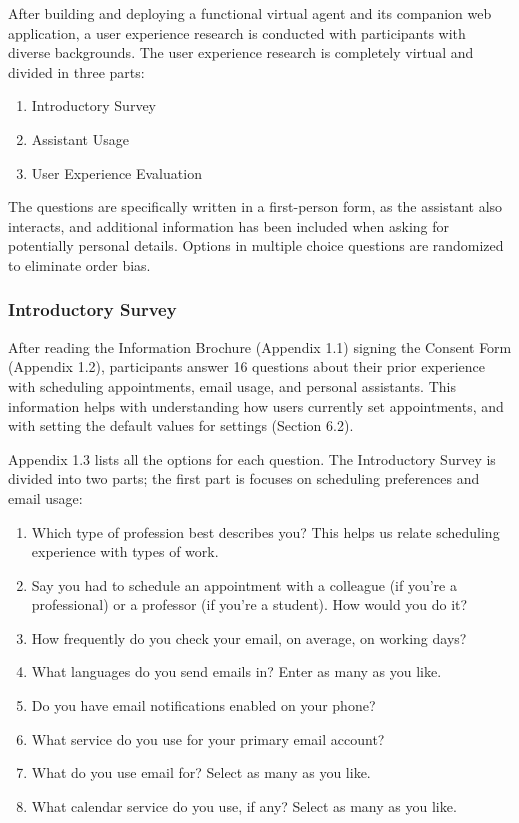 \documentclass{article}
\begin{document}
After building and deploying a functional virtual agent and its companion web application, a user experience research is conducted with participants with diverse backgrounds. The user experience research is completely virtual and divided in three parts:

\begin{enumerate}
	\item Introductory Survey
	\item Assistant Usage
	\item User Experience Evaluation
\end{enumerate}

The questions are specifically written in a first-person form, as the assistant also interacts, and additional information has been included when asking for potentially personal details. Options in multiple choice questions are randomized to eliminate order bias.

\subsubsection{Introductory Survey}

After reading the Information Brochure (Appendix 1.1) signing the Consent Form (Appendix 1.2), participants answer 16 questions about their prior experience with scheduling appointments, email usage, and personal assistants. This information helps with understanding how users currently set appointments, and with setting the default values for settings (Section 6.2).

Appendix 1.3 lists all the options for each question. The Introductory Survey is divided into two parts; the first part is focuses on scheduling preferences and email usage:

\begin{enumerate}
	\item Which type of profession best describes you? This helps us relate scheduling experience with types of work.
	\item Say you had to schedule an appointment with a colleague (if you're a professional) or a professor (if you're a student). How would you do it?
	\item How frequently do you check your email, on average, on working days?
	\item What languages do you send emails in? Enter as many as you like.
	\item Do you have email notifications enabled on your phone?
	\item What service do you use for your primary email account?
	\item What do you use email for? Select as many as you like.
	\item What calendar service do you use, if any? Select as many as you like.
\end{enumerate}
\end{document}
